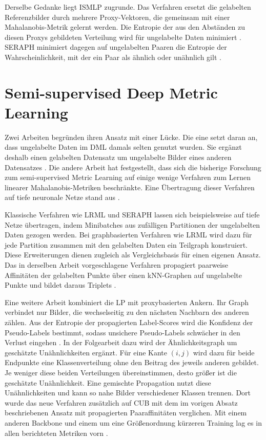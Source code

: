 Derselbe Gedanke liegt \ac{ISMLP} zugrunde. Das Verfahren ersetzt die gelabelten Referenzbilder durch mehrere Proxy-Vektoren, die gemeinsam mit einer Mahalanobis-Metrik gelernt werden. Die Entropie der aus den Abständen zu diesen Proxys gebildeten Verteilung wird für ungelabelte Daten minimiert \cite{chen_efficient_2023}. \ac{SERAPH} minimiert dagegen auf ungelabelten Paaren die Entropie der Wahrscheinlichkeit, mit der ein Paar als ähnlich oder unähnlich gilt \cite{niu_information-theoretic_2012}.

\section{Semi-supervised Deep Metric Learning}
\label{sec:ssdml}

Zwei Arbeiten begründen ihren Ansatz mit einer Lücke. Die eine setzt daran an, dass ungelabelte Daten im \ac{DML} damals selten genutzt wurden. Sie ergänzt deshalb einen gelabelten Datensatz um ungelabelte Bilder eines anderen Datensatzes \cite{duan_slade_2021}. Die andere Arbeit hat festgestellt, dass sich die bisherige Forschung zum semi-supervised Metric Learning auf einige wenige Verfahren zum Lernen linearer Mahalanobis-Metriken beschränkte. Eine Übertragung dieser Verfahren auf tiefe neuronale Netze stand aus \cite{dutta_semi-supervised_2021}.

Klassische Verfahren wie \ac{LRML} und \ac{SERAPH} lassen sich beispielsweise auf tiefe Netze übertragen, indem Minibatches aus zufälligen Partitionen der ungelabelten Daten gezogen werden. Bei graphbasierten Verfahren wie \ac{LRML} wird dazu für jede Partition zusammen mit den gelabelten Daten ein Teilgraph konstruiert. Diese Erweiterungen dienen zugleich als Vergleichsbasis für einen eigenen Ansatz. Das in derselben Arbeit vorgeschlagene Verfahren propagiert paarweise Affinitäten der gelabelten Punkte über einen \ac{kNN}-Graphen auf ungelabelte Punkte und bildet daraus Triplets \cite{dutta_semi-supervised_2021}.

Eine weitere Arbeit kombiniert die \acl{LP} mit proxybasierten Ankern. Ihr Graph verbindet nur Bilder, die wechselseitig zu den nächsten Nachbarn des anderen zählen. Aus der Entropie der propagierten Label-Scores wird die Konfidenz der Pseudo-Labels bestimmt, sodass unsichere Pseudo-Labels schwächer in den Verlust eingehen \cite{zhuang_deep_2021}. In der Folgearbeit dazu wird der Ähnlichkeitsgraph um geschätzte Unähnlichkeiten ergänzt. Für eine Kante $(i,j)$ wird dazu für beide Endpunkte eine Klassenverteilung ohne den Beitrag des jeweils anderen gebildet. Je weniger diese beiden Verteilungen übereinstimmen, desto größer ist die geschätzte Unähnlichkeit. Eine gemischte Propagation nutzt diese Unähnlichkeiten und kann so nahe Bilder verschiedener Klassen trennen. Dort wurde das neue Verfahren zusätzlich auf \ac{CUB} mit dem im vorigen Absatz beschriebenen Ansatz mit propagierten Paaraffinitäten verglichen. Mit einem anderen Backbone und einem um eine Größenordnung kürzeren Training lag es in allen berichteten Metriken vorn \cite{zhuang_deep_2023}.

